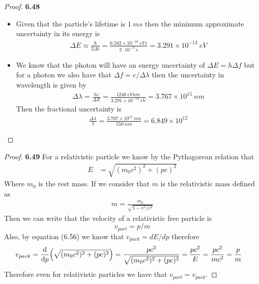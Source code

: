 \documentclass[11pt]{article}
\theoremstyle{definition}
\begin{document}
\begin{proof}{\textbf{6.48}}
\begin{itemize}
    \item [\textbf{(a)}] Given that the particle's lifetime is $1~ms$ then the
    minimum approximate uncertainty in its energy is
    \begin{align*}
        \Delta E \approx \frac{\hbar}{2\Delta t}
        = \frac{6.582 \times 10^{-16}~eVs}{2\cdot 10^{-3}~s} 
        = 3.291 \times 10^{-13}~eV
    \end{align*}
    \item [\textbf{(b)}] We know that the photon will have an energy uncertainty
    of $\Delta E = h \Delta f$ but for a photon we also have that
    $\Delta f = c/\Delta \lambda$ then the uncertainty in wavelength is given by
    \begin{align*}
        \Delta \lambda = \frac{h c}{\Delta E}
        = \frac{1240~eVnm}{3.291 \times 10^{-13}~eV}
        = 3.767 \times 10^{15}~nm
    \end{align*}
    Then the fractional uncertainty is
    \begin{align*}
        \frac{\Delta \lambda}{\lambda}
        = \frac{3.767 \times 10^{15}~nm}{550~nm}
        = 6.849 \times 10^{12}
    \end{align*}
\end{itemize}
\end{proof}
\begin{proof}{\textbf{6.49}}
    For a relativistic particle we know by the Pythagorean relation that
    \begin{align*}
        E &= \sqrt{(m_0c^2)^2 + (pc)^2}
    \end{align*}
    Where $m_0$ is the rest mass. If we consider that $m$ is the relativistic
    mass defined as 
    \begin{align*}
        m = \frac{m_0}{\sqrt{1 - v^2/c^2}}
    \end{align*}
    Then we can write that the velocity of a relativistic free particle is
    $$v_{part} = p/m$$
    Also, by equation (6.56) we know that $v_{pack} = dE/dp$ therefore
    \begin{align*}
        v_{pack} &= \dv{p}(\sqrt{(m_0c^2)^2 + (pc)^2})
        = \frac{pc^2}{\sqrt{(m_0c^2)^2 + (pc)^2}}
        = \frac{pc^2}{E}
        = \frac{pc^2}{mc^2}
        = \frac{p}{m}
    \end{align*}
    Therefore even for relativistic particles we have that
    $v_{part} = v_{pack}$.
\end{proof}
\end{document}
